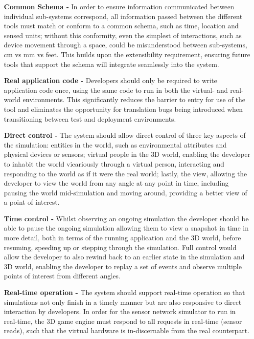 \textbf{Common Schema - }
In order to ensure information communicated between individual sub-systems correspond, all information passed between the different tools must match or conform to a common schema, such as time, location and sensed units; without this conformity, even the simplest of interactions, such as device movement through a space, could be misunderstood between sub-systems, cm vs mm vs feet. This builds upon the extensibility requirement, ensuring future tools that support the schema will integrate seamlessly into the system.


\textbf{Real application code - }
Developers should only be required to write application code once, using the same code to run in both the virtual- and real-world environments. This significantly reduces the barrier to entry for use of the tool and eliminates the opportunity for translation bugs being introduced when transitioning between test and deployment environments.

\textbf{Direct control - }
The system should allow direct control of three key aspects of the simulation: entities in the world, such as environmental attributes and physical devices or sensors; virtual people in the 3D world, enabling the developer to inhabit the world vicariously through a virtual person, interacting and responding to the world as if it were the real world; lastly, the view, allowing the developer to view the world from any angle at any point in time, including pausing the world mid-simulation and moving around, providing a better view of a point of interest.


\textbf{Time control - }
Whilst observing an ongoing simulation the developer should be able to pause the ongoing simulation allowing them to view a snapshot in time in more detail, both in terms of the running application and the 3D world, before resuming, speeding up or stepping through the simulation. Full control would allow the developer to also rewind back to an earlier state in the simulation and 3D world, enabling the developer to replay a set of events and observe multiple points of interest from different angles.

\textbf{Real-time operation - }
The system should support real-time operation so that simulations not only finish in a timely manner but are also responsive to direct interaction by developers. In order for the sensor network simulator to run in real-time, the 3D game engine must respond to all requests in real-time (sensor reads), such that the virtual hardware is in-discernable from the real counterpart.

